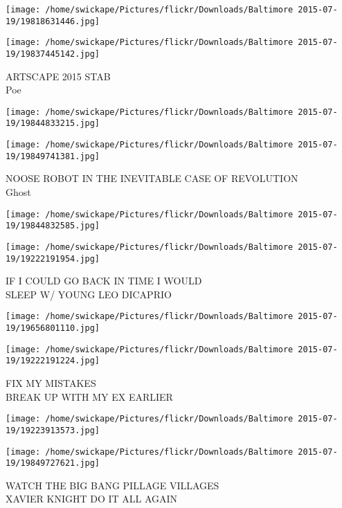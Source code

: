 \documentclass[10pt,letterpaper]{article}
\begin{document}
\texttt{[image: /home/swickape/Pictures/flickr/Downloads/Baltimore 2015-07-19/19818631446.jpg]}

\vspace{0.25in}
\texttt{[image: /home/swickape/Pictures/flickr/Downloads/Baltimore 2015-07-19/19837445142.jpg]}

ARTSCAPE 2015 STAB\\
Poe\\
\pagebreak

\texttt{[image: /home/swickape/Pictures/flickr/Downloads/Baltimore 2015-07-19/19844833215.jpg]}

\vspace{0.25in}
\texttt{[image: /home/swickape/Pictures/flickr/Downloads/Baltimore 2015-07-19/19849741381.jpg]}

NOOSE ROBOT IN THE INEVITABLE CASE OF REVOLUTION\\
Ghost\\
\pagebreak

\texttt{[image: /home/swickape/Pictures/flickr/Downloads/Baltimore 2015-07-19/19844832585.jpg]}

\vspace{0.25in}
\texttt{[image: /home/swickape/Pictures/flickr/Downloads/Baltimore 2015-07-19/19222191954.jpg]}

IF I COULD GO BACK IN TIME I WOULD\\
SLEEP W/ YOUNG LEO DICAPRIO\\
\pagebreak

\texttt{[image: /home/swickape/Pictures/flickr/Downloads/Baltimore 2015-07-19/19656801110.jpg]}

\vspace{0.25in}
\texttt{[image: /home/swickape/Pictures/flickr/Downloads/Baltimore 2015-07-19/19222191224.jpg]}

FIX MY MISTAKES\\
BREAK UP WITH MY EX EARLIER\\
\pagebreak

\texttt{[image: /home/swickape/Pictures/flickr/Downloads/Baltimore 2015-07-19/19223913573.jpg]}

\vspace{0.25in}
\texttt{[image: /home/swickape/Pictures/flickr/Downloads/Baltimore 2015-07-19/19849727621.jpg]}

WATCH THE BIG BANG PILLAGE VILLAGES\\
XAVIER KNIGHT DO IT ALL AGAIN\\
\pagebreak
\end{document}
